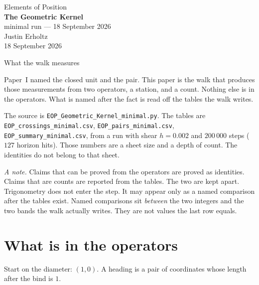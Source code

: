 \documentclass[10pt,a4paper]{article}
\theoremstyle{plain}
\theoremstyle{definition}
\theoremstyle{remark}
\begin{document}
\begin{center}
\vspace*{2.2em}
{\large Elements of Position}\\[1.6em]
{\LARGE\bfseries The Geometric Kernel}\\[0.6em]
{\small minimal run --- 18 September 2026}\\[1.4em]
{\normalsize Justin Erholtz}\\[0.35em]
{\small 18 September 2026}
\end{center}

\vspace{1.6em}

\begin{center}
{\large What the walk measures}
\end{center}

\vspace{1.4em}

\noindent
Paper~I named the closed unit and the pair.
This paper is the walk that produces those measurements from two operators, a station, and a count.
Nothing else is in the operators.
What is named after the fact is read off the tables the walk writes.

The source is \texttt{EOP\_Geometric\_Kernel\_minimal.py}.
The tables are \texttt{EOP\_crossings\_minimal.csv}, \texttt{EOP\_pairs\_minimal.csv}, \texttt{EOP\_summary\_minimal.csv}, from a run with shear \(h=0.002\) and \(200\,000\) steps (\(127\) horizon hits).
Those numbers are a sheet size and a depth of count.
The identities do not belong to that sheet.

\vspace{1.2em}

\noindent
\textit{A note.}
Claims that can be proved from the operators are proved as identities.
Claims that are counts are reported from the tables.
The two are kept apart.
Trigonometry does not enter the step.
It may appear only as a named comparison after the tables exist.
Named comparisons sit \emph{between} the two integers and the two bands the walk actually writes.
They are not values the last row equals.

\newpage
\tableofcontents
\newpage

\section{What is in the operators}

Start on the diameter: \((1,0)\).
A heading is a pair of coordinates whose length after the bind is \(1\).
\end{document}
